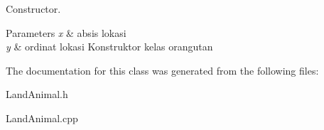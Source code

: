 Constructor. 


\begin{DoxyParams}{Parameters}
{\em x} & absis lokasi \\
\hline
{\em y} & ordinat lokasi Konstruktor kelas orangutan \\
\hline
\end{DoxyParams}


The documentation for this class was generated from the following files\+:\begin{DoxyCompactItemize}
\item 
Land\+Animal.\+h\item 
Land\+Animal.\+cpp\end{DoxyCompactItemize}
